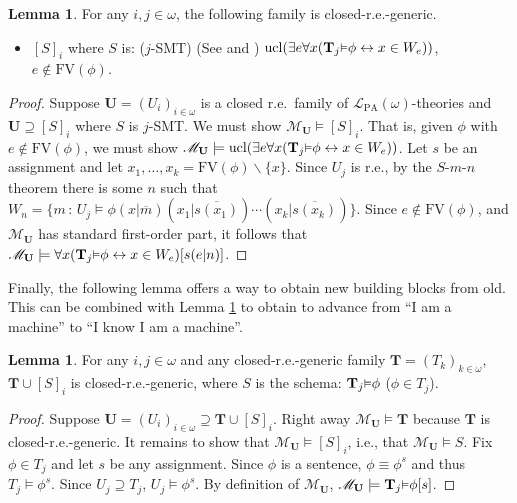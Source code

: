 \documentclass[reqno]{article}
\theoremstyle{definition}
\newtheorem{lemma}[theorem]{Lemma}
\def\L{\mathscr{L}}
\def\M{\mathscr{M}}
\def\T{\mathbf{T}}
\def\U{\mathbf{U}}
\def\FV{\mathrm{FV}}
\def\LPA{\L_{\mathrm{PA}}}
\renewcommand{\Pr}[1]{\T_{#1}\mbox{\small${\vDash}$}}
\newcommand{\ucl}[1]{\mathrm{ucl}(#1)}
\begin{document}
\begin{lemma}
\label{firstutilbagsmt}
For any $i,j\in\omega$, the following family is closed-r.e.-generic.
\begin{itemize}
\item $[S]_i$ where $S$ is: ($j$-SMT)
(See \cite{carlson2000} and \cite{reinhardt}) $\ucl{\exists e\forall x(\Pr 
j\phi\leftrightarrow x\in W_e)}$, $e\not\in\FV(\phi)$.
\end{itemize}
\end{lemma}

\begin{proof}
Suppose $\U=(U_i)_{i\in\omega}$ is a closed r.e.~family of
$\LPA(\omega)$-theories and $\U\supseteq [S]_i$ where $S$ is $j$-SMT.
We must show $\M_{\U}\models [S]_i$.
That is, given $\phi$ with $e\not\in\FV(\phi)$, we must show
$\M_{\U}\models \ucl{\exists e \forall x (\Pr j \phi \leftrightarrow x\in W_e)}$.
Let $s$ be an assignment and let $x_1,\ldots,x_k=\FV(\phi)\backslash\{x\}$.
Since $U_j$ is r.e., by the $S$-$m$-$n$ theorem there is some $n$
such that $W_n=\{m\,:\,U_j\models \phi(x|\overline{m})(x_1|\overline{s(x_1)})
\cdots (x_k|\overline{s(x_k)})\}$.  Since $e\not\in\FV(\phi)$, and $\M_{\U}$ has
standard first-order part, it follows that
$\M_{\U}\models \forall x(\Pr j \phi\leftrightarrow x\in W_e)[s(e|n)]$.
\end{proof}

Finally, the following lemma offers a way to obtain new building blocks from old.
This can be combined with Lemma \ref{firstutilbagsmt} to obtain
to advance from ``I am a machine'' to ``I know I am a machine''.

\begin{lemma}
\label{firstutilbagclosure}
For any $i,j\in\omega$ and any closed-r.e.-generic family $\T=(T_k)_{k\in\omega}$,
$\T\cup [S]_i$ is closed-r.e.-generic,
where $S$ is the schema: $\Pr j\phi$ ($\phi\in T_j$).
\end{lemma}

\begin{proof}
Suppose $\U=(U_i)_{i\in\omega}\supseteq \T\cup [S]_i$.
Right away $\M_{\U}\models \T$
because $\T$ is closed-r.e.-generic.  It remains to show that
$\M_{\U}\models [S]_i$, i.e., that $\M_{\U}\models S$.
Fix $\phi\in T_j$ and let $s$ be any assignment.  Since $\phi$ is a sentence,
$\phi\equiv\phi^s$ and thus
$T_j\models\phi^s$.  Since $U_j\supseteq T_j$, $U_j\models\phi^s$.
By definition of $\M_{\U}$, $\M_{\U}\models \Pr j\phi[s]$.
\end{proof}
\end{document}
